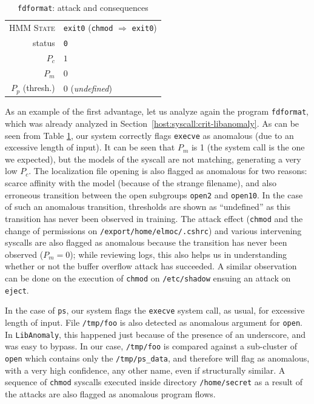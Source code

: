 \begin{table}[p]
\begin{tabular}{rl}
    \textsc{HMM State} & \texttt{exit0} (\texttt{chmod} $\Rightarrow$ \texttt{exit0}) \\
    \cmidrule{2-2}
    status & \texttt{0}\\
    \cmidrule{2-2}
    $P_c$ & $1$ \\
    $P_m$ & $0$ \\
    $P_p$ (thresh.) & $0$ (\emph{undefined})\\
    \bottomrule
  \end{tabular}
  \caption{\texttt{fdformat}: attack and consequences}
  \label{tab:fdformat-our-results}
\end{table}

As an example of the first advantage, let us analyze again the program
\texttt{fdformat}, which was already analyzed in
Section~\ref{host:syscall:crit-libanomaly}. As can be seen from Table
\ref{tab:fdformat-our-results}, our system correctly flags
\texttt{execve} as anomalous (due to an excessive length of input). It
can be seen that $P_m$ is 1 (the system call is the one we expected),
but the models of the syscall are not matching, generating a very low
$P_c$. The localization file opening is also flagged as anomalous for
two reasons: scarce affinity with the model (because of the strange
filename), and also erroneous transition between the open subgroups
\texttt{open2} and \texttt{open10}. In the case of such an anomalous
transition, thresholds are shown as ``undefined'' as this transition
has never been observed in training. The attack effect (\texttt{chmod}
and the change of permissions on \texttt{/export/home/elmoc/.cshrc})
and various intervening syscalls are also flagged as anomalous because
the transition has never been observed ($P_m = 0$); while reviewing
logs, this also helps us in understanding whether or not the buffer
overflow attack has succeeded. A similar observation can be done on
the execution of \texttt{chmod} on \texttt{/etc/shadow} ensuing an
attack on \texttt{eject}.

In the case of \texttt{ps}, our system flags the \texttt{execve}
system call, as usual, for excessive length of input. File
\texttt{/tmp/foo} is also detected as anomalous argument for
\texttt{open}. In \texttt{LibAnomaly}, this happened just because of
the presence of an underscore, and was easy to bypass. In our case,
\texttt{/tmp/foo} is compared against a sub-cluster of \texttt{open}
which contains only the \texttt{/tmp/ps\_data}, and therefore will
flag as anomalous, with a very high confidence, any other name, even
if structurally similar. A sequence of \texttt{chmod} syscalls
executed inside directory \texttt{/home/secret} as a result of the
attacks are also flagged as anomalous program flows.

